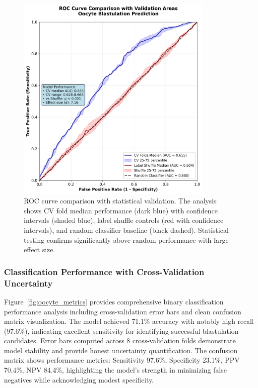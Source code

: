\begin{figure}[H]
    \centering
    \includegraphics[width=0.85\textwidth]{figures/oocyte_roc_comparison.png}
    \caption{ROC curve comparison with statistical validation. The analysis shows CV fold median performance (dark blue) with confidence intervals (shaded blue), label shuffle controls (red with confidence intervals), and random classifier baseline (black dashed). Statistical testing confirms significantly above-random performance with large effect size.}
    \label{fig:oocyte_roc}
\end{figure}

\subsubsection{Classification Performance with Cross-Validation Uncertainty}

Figure~\ref{fig:oocyte_metrics} provides comprehensive binary classification performance analysis including cross-validation error bars and clean confusion matrix visualization. The model achieved 71.1\% accuracy with notably high recall (97.6\%), indicating excellent sensitivity for identifying successful blastulation candidates. Error bars computed across 8 cross-validation folds demonstrate model stability and provide honest uncertainty quantification. The confusion matrix shows performance metrics: Sensitivity 97.6\%, Specificity 23.1\%, PPV 70.4\%, NPV 84.4\%, highlighting the model's strength in minimizing false negatives while acknowledging modest specificity.

